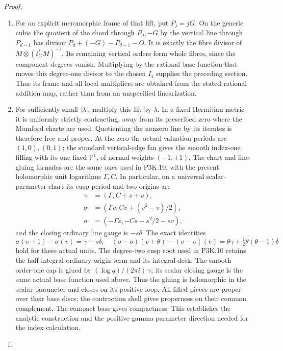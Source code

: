 \begin{proof}
\begin{enumerate}[label=\arabic*.]
\item For an explicit meromorphic frame of that lift, put \(P_j=jG\).
On the generic cubic the quotient of the chord through
\(P_d,-G\) by the vertical line through \(P_{d-1}\) has divisor
\(P_d+(-G)-P_{d-1}-O\).  It is exactly the fibre divisor of
\(M\otimes(t_G^*M)^{-1}\).  Its remaining vertical orders form
whole fibres, since the component degrees vanish.  Multiplying by
the rational base function that moves this degree-one divisor to the
chosen \(I_1\) supplies the preceding section.  Thus its frame and
all local multipliers are obtained from the stated rational addition
map, rather than from an unspecified linearization.

\item For sufficiently small \(|\lambda|\), multiply this lift by
\(\lambda\).  In a fixed Hermitian metric it is uniformly strictly
contracting, away from its prescribed zero where the Mumford charts
are used.  Quotienting the nonzero line by its iterates is therefore
free and proper.  At the zero the actual valuation periods are
\((1,0),(0,1)\); the standard vertical-edge fan gives the smooth
index-one filling with its one fixed \(\mathbb P^1\), of normal
weights \((-1,+1)\).  The chart and line-gluing formulas are the
same ones used in P3K.10, with the present holomorphic unit logarithms
\(\Gamma,C\).  In particular, on a universal scalar-parameter
chart its cusp period and two origins are
\[
 \begin{aligned}
 \gamma&=(\Gamma,C+s+v),\\
 \sigma&=(\Gamma v,Cv+(v^2-v)/2),\\
 o&=(-\Gamma s,-Cs-s^2/2-sv),
 \end{aligned}                                                     \tag{P3K.22.3}
\]
and the closing ordinary line gauge is \(-s\delta\).  The exact
identities
\[
 \sigma(v+1)-\sigma(v)=\gamma-s\delta,
 \quad (\sigma-o)(v+\theta)-(\sigma-o)(v)
      =\theta\gamma+\tfrac12\theta(\theta-1)\delta
\]
hold for these actual units.  The degree-two cusp root used in
P3K.10 retains the half-integral ordinary-origin term and its integral
deck.  The smooth order-one cap is glued by
\((\log q)/(2\pi i)\,\gamma\); its scalar closing gauge is the
same actual base function used above.  Thus the gluing is holomorphic
in the scalar parameter and closes on its positive loop.  All filled
pieces are proper over their base discs; the contraction shell gives
properness on their common complement.  The compact base gives
compactness.  This establishes the analytic construction and the
positive-gamma parameter direction needed for the index calculation.


\end{enumerate}
\end{proof}
